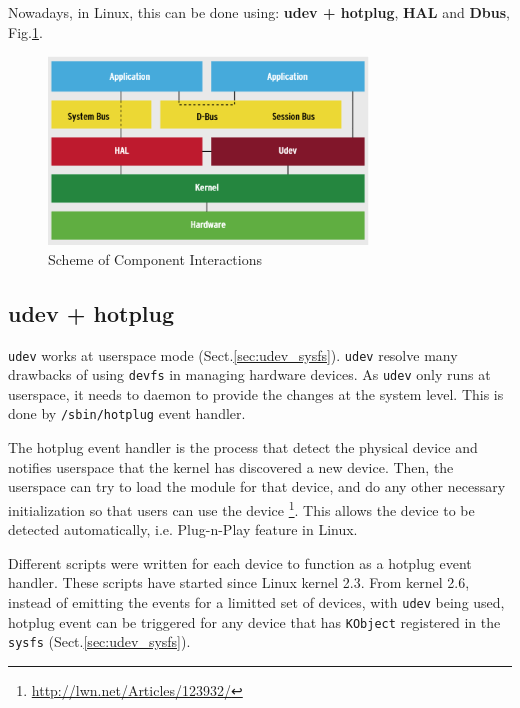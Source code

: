 Nowadays, in Linux, this can be
done using: {\bf udev + hotplug}, {\bf HAL} and {\bf Dbus},
Fig.\ref{fig:component_interaction_Linux}.

\begin{figure}[hbt]
  \centerline{\includegraphics[height=5cm,
  angle=0]{./images/component_interaction.eps}}
  \caption{Scheme of Component Interactions}
  \label{fig:component_interaction_Linux}
\end{figure}


\subsection{udev + hotplug}
\label{sec:hotplug_udev}



\verb!udev! works at userspace mode (Sect.\ref{sec:udev_sysfs}). \verb!udev!
resolve many drawbacks of using \verb!devfs! in managing hardware devices. As
\verb!udev! only runs at userspace, it needs to daemon to provide the changes at
the system level. This is done by \verb!/sbin/hotplug! event handler.

The hotplug event handler is the process that detect the physical device and
notifies userspace that the kernel has discovered a new device. Then, the
userspace can try to load the module for that device, and do any other necessary
initialization so that users can use the device
\footnote{\url{http://lwn.net/Articles/123932/}}. This allows the device to be
detected automatically, i.e. Plug-n-Play feature in Linux. 

Different scripts were written for each device to function as a hotplug event
handler. These scripts have started since Linux kernel 2.3. From kernel 2.6,
instead of emitting the events for a limitted set of devices, with \verb!udev! being
used, hotplug event can be triggered for any device that has \verb!KObject!
registered in the \verb!sysfs! (Sect.\ref{sec:udev_sysfs}). 

